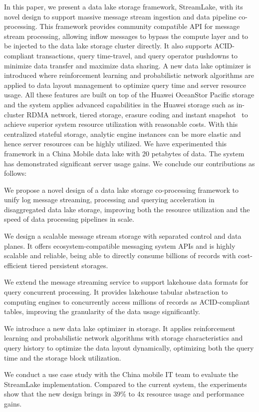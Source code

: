 In this paper, we present a data lake storage framework, StreamLake, with its novel design to support massive message stream ingestion and data pipeline co-processing. This framework provides community compatible API for message stream processing, allowing inflow messages to bypass the compute layer and to be injected to the data lake storage cluster directly. It also supports ACID-compliant transactions, query time-travel, and query operator pushdowns to minimize data transfer and maximize data sharing. A new data lake optimizer is introduced where reinforcement learning and probabilistic network algorithms are applied to data layout management to optimize query time and server resource usage. All these features are built on top of the Huawei OceanStor Pacific storage and the system applies advanced capabilities in the Huawei storage such as in-cluster RDMA network, tiered storage, erasure coding and instant snapshot~\cite{} to achieve superior system resource utilization with reasonable costs. With this centralized stateful storage, analytic engine instances can be more elastic and hence server resources can be highly utilized. We have experimented this framework in a China Mobile data lake with 20 petabytes of data. The system has demonstrated significant server usage gains. We conclude our contributions as follows:

We propose a novel design of a data lake storage co-processing framework to unify log message streaming, processing and querying acceleration in disaggregated data lake storage, improving both the resource utilization and the speed of data processing pipelines in scale.


We design a scalable message stream storage with separated control and data planes. It offers ecosystem-compatible messaging system APIs and is highly scalable and reliable, being able to directly consume billions of records with cost-efficient tiered persistent storages. 


We extend the message streaming service to support lakehouse data formats for query concurrent processing. It provides lakehouse tabular abstraction to computing engines to concurrently access millions of records as ACID-compliant tables, improving the granularity of the data usage significantly.


We introduce a new data lake optimizer in storage. It applies reinforcement learning and probabilistic network algorithms with storage characteristics and query history to optimize the data layout dynamically, optimizing both the query time and the storage block utilization.

We conduct a use case study with the China mobile IT team to evaluate the StreamLake implementation. Compared to the current system, the experiments show that the new design brings in 39\% to 4x resource usage and performance gains.

